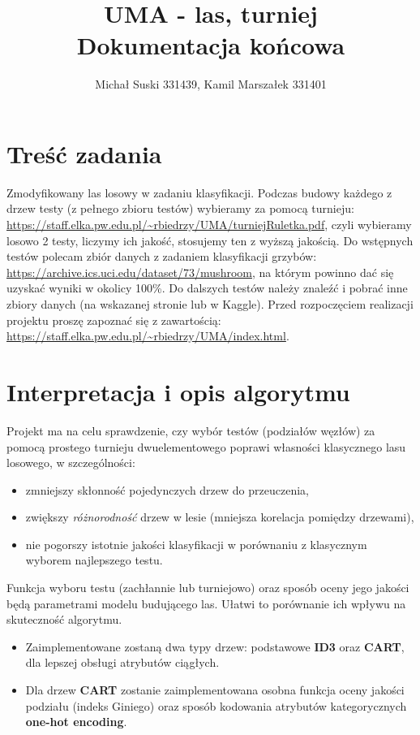 \documentclass[a4paper]{article}
\title{UMA - las, turniej\\
Dokumentacja końcowa}
\author{Michał Suski 331439, Kamil Marszałek 331401}
\date{}
\begin{document}
\maketitle

\section{Treść zadania}
Zmodyfikowany las losowy w zadaniu klasyfikacji. Podczas budowy każdego z drzew testy (z pełnego zbioru testów) wybieramy za pomocą turnieju: \url{https://staff.elka.pw.edu.pl/~rbiedrzy/UMA/turniejRuletka.pdf}, czyli wybieramy losowo 2 testy, liczymy ich jakość, stosujemy ten z wyższą jakością. Do wstępnych testów polecam zbiór danych z zadaniem klasyfikacji grzybów: \url{https://archive.ics.uci.edu/dataset/73/mushroom}, na którym powinno dać się uzyskać wyniki w okolicy 100\%. Do dalszych testów należy znaleźć i pobrać inne zbiory danych (na wskazanej stronie lub w Kaggle). Przed rozpoczęciem realizacji projektu proszę zapoznać się z zawartością: \url{https://staff.elka.pw.edu.pl/~rbiedrzy/UMA/index.html}.

\section{Interpretacja i opis algorytmu}

Projekt ma na celu sprawdzenie, czy wybór testów (podziałów węzłów) za pomocą prostego turnieju dwuelementowego poprawi własności klasycznego lasu losowego, w szczególności:
\begin{itemize}
    \item zmniejszy skłonność pojedynczych drzew do przeuczenia,
    \item zwiększy \emph{różnorodność} drzew w lesie (mniejsza korelacja pomiędzy drzewami),
    \item nie pogorszy istotnie jakości klasyfikacji w porównaniu z klasycznym wyborem najlepszego testu.
\end{itemize}



Funkcja wyboru testu (zachłannie lub turniejowo) oraz sposób oceny jego jakości będą parametrami modelu budującego las. Ułatwi to porównanie ich wpływu na skuteczność algorytmu.

\begin{itemize}
    \item Zaimplementowane zostaną dwa typy drzew: podstawowe \textbf{ID3} oraz \textbf{CART}, dla lepszej obsługi atrybutów ciągłych.
    \item Dla drzew \textbf{CART} zostanie zaimplementowana osobna funkcja oceny jakości podziału (indeks Giniego) oraz sposób kodowania atrybutów kategorycznych \textbf{one-hot encoding}.
\end{itemize}
\end{document}
